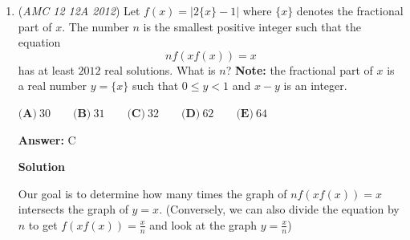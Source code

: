 \begin{enumerate}
 We can clearly see that there will be no solution k where k is even, as the $k$th term in $\{a_k\}_{k=1}^{2011}$ will appear in the same position in its sequence as the $2k$th term does in $\{a_k\}_{k=1}^{2011}$, where k is even. Therefore, we only have to look at the odd terms of $a_k$, which occur in the latter part of $b_k$.

 Looking at the back of both sequences, we see that term k in $\{a_k\}_{k=1}^{2011}$ progresses backwards in the equation $2012 - k$, and that term k in $\{a_k\}_{k=1}^{2011}$ progresses backwards in the equation $2k - 1$. Setting these two expressions equal to each other, we get $671$.

 However, remember that we started counting from the back of both sequences. So, plugging $671$ back into either side of the equation from earlier, we get our answer of $\boxed{\textbf{(C)} 1341}$.

 Sorry for the sloppy explanation. It's been two years since I've tried to give a solution to a problem, and this is the first time I've really used \LaTeX. But I think this solution takes a different approach than the one above.

 \href{https://artofproblemsolving.com/videos/amc/2012amc12a/255}{https://artofproblemsolving.com/videos/amc/2012amc12a/255}

 


	\item (\textit{AMC 12 12A 2012}) Let $f(x)=|2\{x\}-1|$ where $\{x\}$ denotes the fractional part of $x$.  The number $n$ is the smallest positive integer such that the equation 
 \[nf(xf(x))=x\] has at least $2012$ real solutions.  What is $n$?  \textbf{Note:} the fractional part of $x$ is a real number $y=\{x\}$ such that $0\le y<1$ and $x-y$ is an integer.


 $\textbf{(A)}\ 30\qquad\textbf{(B)}\ 31\qquad\textbf{(C)}\ 32\qquad\textbf{(D)}\ 62\qquad\textbf{(E)}\ 64$

 \textbf{Answer: }C



\textbf{Solution}

Our goal is to determine how many times the graph of $nf(xf(x))=x$ intersects the graph of $y=x$. (Conversely, we can also divide the equation by $n$ to get $f(xf(x))=\frac{x}{n}$ and look at the graph $y=\frac{x}{n}$)


\end{enumerate}
